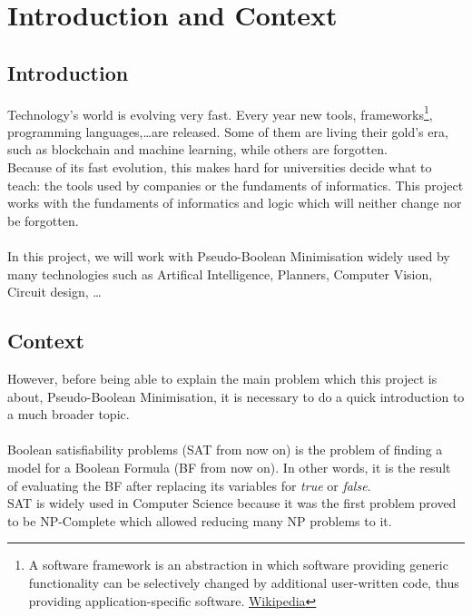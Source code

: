 \chapter{Introduction and Context}
\label{Chapter1}

\section{Introduction}
Technology's world is evolving very fast. Every year new tools, frameworks\footnote{A software framework is an abstraction in which software providing generic functionality can be selectively changed by additional user-written code, thus providing application-specific software. \href{https://en.wikipedia.org/wiki/Software_framework}{Wikipedia}}, programming languages,\ldots are released. Some of them are living their gold's era, such as blockchain and machine learning,  while others are forgotten.  \\
Because of its fast evolution, this makes hard for universities decide what to teach: the tools used by companies or the fundaments of informatics. 
This project works with the fundaments of informatics and logic which will neither change nor be forgotten.\\\\
In this project, we will work with Pseudo-Boolean Minimisation widely used by many technologies such as Artifical Intelligence, Planners, Computer Vision,  Circuit design, \ldots 


\section{Context} 

However, before being able to explain the main problem which this project is about, Pseudo-Boolean Minimisation, it is necessary to do a quick introduction to a much broader topic. \\\\
Boolean satisfiability problems (SAT from now on) is the problem of finding a model for a Boolean Formula (BF from now on). In other words, it is the result of evaluating the BF after replacing its variables for \emph{true} or \emph{false}. \\
SAT is widely used in Computer Science because it was the first problem proved to be NP-Complete which allowed reducing many NP problems to it\cite{Cook1971}.

